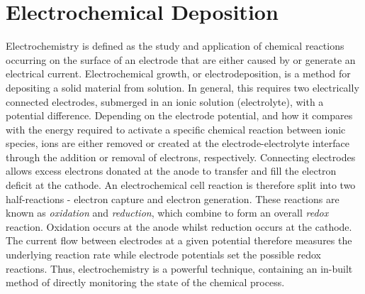 \documentclass{article}
\begin{document}
\section{Electrochemical Deposition}


Electrochemistry is defined as the study and application of chemical reactions occurring on the surface of an electrode that are either caused by or generate an electrical current. Electrochemical growth, or electrodeposition, is a method for depositing a solid material from solution. In general, this requires two electrically connected electrodes, submerged in an ionic solution (electrolyte), with a potential difference. Depending on the electrode potential, and how it compares with the energy required to activate a specific chemical reaction between ionic species, ions are either removed or created at the electrode-electrolyte interface through the addition or removal of electrons, respectively. Connecting electrodes allows excess electrons donated at the anode to transfer and fill the electron deficit at the cathode. An electrochemical cell reaction is therefore split into two half-reactions - electron capture and electron generation. These reactions are known as \emph{oxidation} and \emph{reduction}, which combine to form an overall \emph{redox} reaction. Oxidation occurs at the anode whilst reduction occurs at the cathode. The current flow between electrodes at a given potential therefore measures the underlying reaction rate while electrode potentials set the possible redox reactions. Thus, electrochemistry is a powerful technique, containing an in-built method of directly monitoring the state of the chemical process.
\end{document}
